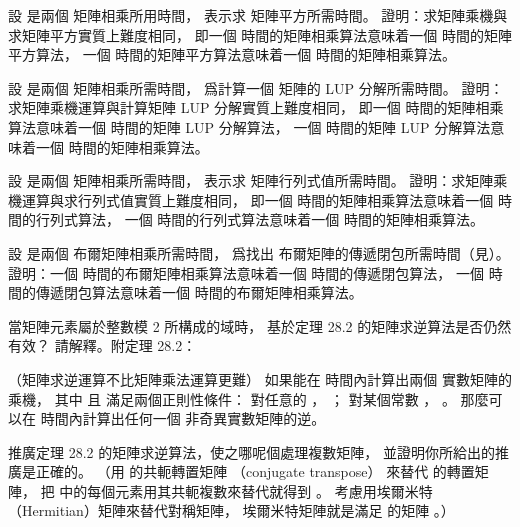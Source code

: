 \startsection[
  title={Inverting matrices},
]

\startEXERCISE
設  是兩個  矩陣相乘所用時間，
  表示求  矩陣平方所需時間。
證明：求矩陣乘機與求矩陣平方實質上難度相同，
即一個  時間的矩陣相乘算法意味着一個  時間的矩陣平方算法，
一個  時間的矩陣平方算法意味着一個  時間的矩陣相乘算法。
\stopEXERCISE

\startANSWER
{}
\stopANSWER

\startEXERCISE
設  是兩個  矩陣相乘所需時間，
  爲計算一個  矩陣的 LUP 分解所需時間。
證明：求矩陣乘機運算與計算矩陣 LUP 分解實質上難度相同，
即一個  時間的矩陣相乘算法意味着一個  時間的矩陣 LUP 分解算法，
一個  時間的矩陣 LUP 分解算法意味着一個  時間的矩陣相乘算法。
\stopEXERCISE

\startANSWER
{}
\stopANSWER

\startEXERCISE
設  是兩個  矩陣相乘所需時間，
  表示求  矩陣行列式值所需時間。
證明：求矩陣乘機運算與求行列式值實質上難度相同，
即一個  時間的矩陣相乘算法意味着一個  時間的行列式算法，
一個  時間的行列式算法意味着一個  時間的矩陣相乘算法。
\stopEXERCISE

\startANSWER
{}
\stopANSWER

\startEXERCISE
設  是兩個  布爾矩陣相乘所需時間，
  爲找出  布爾矩陣的傳遞閉包所需時間（見）。
證明：一個  時間的布爾矩陣相乘算法意味着一個  時間的傳遞閉包算法，
一個  時間的傳遞閉包算法意味着一個  時間的布爾矩陣相乘算法。
\stopEXERCISE

\startANSWER
{}
\stopANSWER

\startEXERCISE
當矩陣元素屬於整數模 2 所構成的域時，
基於定理 28.2 的矩陣求逆算法是否仍然有效？
請解釋。附定理 28.2：

（矩陣求逆運算不比矩陣乘法運算更難）
如果能在  時間內計算出兩個  實數矩陣的乘機，
其中  且  滿足兩個正則性條件：
對任意的 ， ；
對某個常數 ， 。
那麼可以在  時間內計算出任何一個  非奇異實數矩陣的逆。
\stopEXERCISE

\startANSWER
{}
\stopANSWER

\startEXERCISE
推廣定理 28.2 的矩陣求逆算法，使之哪呢個處理複數矩陣，
並證明你所給出的推廣是正確的。
（\hint 用  的{\EMP 共軛轉置矩陣}
（conjugate transpose）  來替代  的轉置矩陣，
把  中的每個元素用其共軛複數來替代就得到 。
考慮用{\EMP 埃爾米特}（Hermitian）矩陣來替代對稱矩陣，
埃爾米特矩陣就是滿足  的矩陣 。）
\stopEXERCISE

\startANSWER
{}
\stopANSWER

\stopsection
